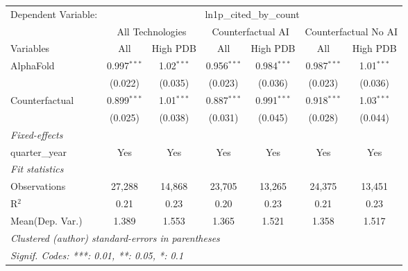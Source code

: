 \begingroup
\centering
\begin{tabular}{lcccccc}
   \tabularnewline \midrule \midrule
   Dependent Variable: & \multicolumn{6}{c}{ln1p\_cited\_by\_count}\\
 & \multicolumn{2}{c}{All Technologies} & \multicolumn{2}{c}{Counterfactual AI} & \multicolumn{2}{c}{Counterfactual No AI} \\
\cmidrule(lr){1-1}\cmidrule(lr){2-3} \cmidrule(lr){4-5} \cmidrule(lr){6-7}
Variables & \multicolumn{1}{c}{All} & \multicolumn{1}{c}{High PDB} & \multicolumn{1}{c}{All} & \multicolumn{1}{c}{High PDB} & \multicolumn{1}{c}{All} & \multicolumn{1}{c}{High PDB} \\
\cmidrule(lr){1-1}\cmidrule(lr){2-2} \cmidrule(lr){3-3} \cmidrule(lr){4-4} \cmidrule(lr){5-5} \cmidrule(lr){6-6} \cmidrule(lr){7-7}
   AlphaFold      & 0.997$^{***}$ & 1.02$^{***}$ & 0.956$^{***}$ & 0.984$^{***}$ & 0.987$^{***}$ & 1.01$^{***}$\\   
                  & (0.022)       & (0.035)      & (0.023)       & (0.036)       & (0.023)       & (0.036)\\   
   Counterfactual & 0.899$^{***}$ & 1.01$^{***}$ & 0.887$^{***}$ & 0.991$^{***}$ & 0.918$^{***}$ & 1.03$^{***}$\\   
                  & (0.025)       & (0.038)      & (0.031)       & (0.045)       & (0.028)       & (0.044)\\   
   \midrule
   \emph{Fixed-effects}\\
   quarter\_year  & Yes           & Yes          & Yes           & Yes           & Yes           & Yes\\  
   \midrule
   \emph{Fit statistics}\\
   Observations   & 27,288        & 14,868       & 23,705        & 13,265        & 24,375        & 13,451\\  
   R$^2$          & 0.21          & 0.23         & 0.20          & 0.23          & 0.21          & 0.23\\  
Mean(Dep. Var.) & 1.389 & 1.553 & 1.365 & 1.521 & 1.358 & 1.517 \\
   \midrule \midrule
   \multicolumn{7}{l}{\emph{Clustered (author) standard-errors in parentheses}}\\
   \multicolumn{7}{l}{\emph{Signif. Codes: ***: 0.01, **: 0.05, *: 0.1}}\\
\end{tabular}
\par\endgroup

